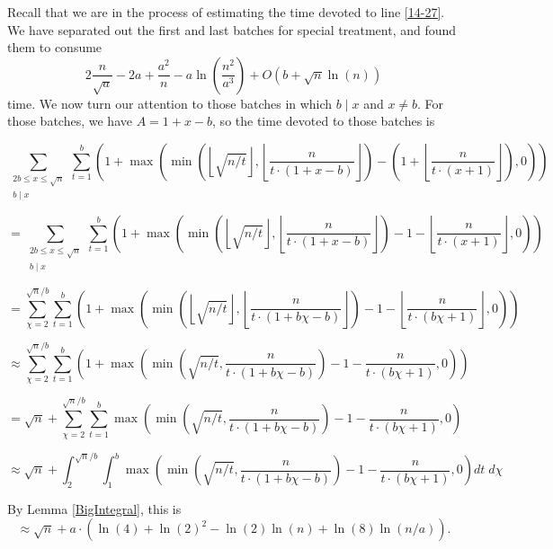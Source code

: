 \documentclass[12pt]{article}
\newcommand{\eqn}[1]{\begin{displaymath} #1 \end{displaymath}}
\newcommand{\floor}[1]{{\left\lfloor #1 \right\rfloor}}
\newcommand{\floordiv}[2]{\floor{\frac{#1}{#2}}}
\newcommand{\isqrt}[1]{\floor{\sqrt{#1}}}
\begin{document}
Recall that we are in the process of estimating the time devoted to line \ref{14-27}.  We have separated out the first and last batches for special treatment, and found them to consume
\eqn{2\frac{n}{\sqrt{a}} - 2a + \frac{a^2}{n} - a\ln\left(\frac{n^2}{a^3}\right) + O(b + \sqrt{n} \ln(n))}
time.  We now turn our attention to those batches in which $b \mid x$ and $x \neq b$.  For those batches, we have $A = 1 + x - b$, so the time devoted to those batches is

\eqn{\sum_{\substack{2b \leq x \leq \sqrt{n} \\ b \mid x}}\sum_{t=1}^b \left( 1 + \max\left( \min \left( \isqrt{n/t} , \floordiv{n}{t \cdot (1 + x - b)} \right)
-
\left( 1 + \floordiv{n}{t \cdot (x+1)} \right)
, 0 \right) \right)}

\eqn{= \sum_{\substack{2b \leq x \leq \sqrt{n} \\ b \mid x}}\sum_{t=1}^b \left( 1 + \max\left( \min \left( \isqrt{n/t} , \floordiv{n}{t \cdot (1 + x - b)} \right)
- 1
- \floordiv{n}{t \cdot (x+1)}
, 0 \right) \right)}

\eqn{= \sum_{\chi=2}^{\sqrt{n}/b} \sum_{t=1}^b \left( 1 + \max\left( \min \left( \isqrt{n/t} , \floordiv{n}{t \cdot (1 + b\chi - b)} \right)
- 1
- \floordiv{n}{t \cdot (b\chi + 1)}
, 0 \right) \right)}

\eqn{\approx \sum_{\chi=2}^{\sqrt{n}/b} \sum_{t=1}^b \left( 1 + \max\left( \min \left( \sqrt{n/t} , \frac{n}{t \cdot (1 + b\chi - b)} \right)
- 1
- \frac{n}{t \cdot (b\chi + 1)}
, 0 \right) \right)}

\eqn{= \sqrt{n} + \sum_{\chi=2}^{\sqrt{n}/b} \sum_{t=1}^b \max\left( \min \left( \sqrt{n/t} , \frac{n}{t \cdot (1 + b\chi - b)} \right)
- 1
- \frac{n}{t \cdot (b\chi + 1)}
, 0 \right)}

\eqn{\approx \sqrt{n} + \int_2^{\sqrt{n}/b} \int_1^b
\max\left( \min \left( \sqrt{n/t} , \frac{n}{t \cdot (1 + b\chi - b)} \right)
- 1
- \frac{n}{t \cdot (b\chi + 1)}
, 0 \right) dt \; d\chi}

By Lemma \ref{BigIntegral}, this is
\eqn{\approx \sqrt{n} + a \cdot \left( \ln(4) + \ln(2)^2 - \ln(2) \ln(n) + \ln(8)\ln(n/a) \right).}
\end{document}
